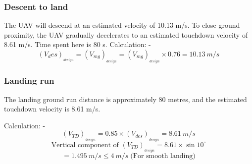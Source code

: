 \documentclass[12 pt]{article}
\begin{document}
\subsubsection{Descent to land \cite{Anderson1}}
The UAV will descend at an estimated velocity of 10.13 m/s. To close ground proximity, the UAV gradually decelerates to an estimated touchdown velocity of 8.61 m/s. Time spent here is 80 s.
Calculation: - 
$$(V_des)_{_{design}} = (V_{mg})_{_{design}} = (V_{mg})_{_{design}} \times 0.76 = 10.13 \: m/s $$

\subsubsection{Landing run}
The landing ground run distance is approximately 80 metres, and the estimated touchdown velocity is 8.61 m/s.

Calculation: - 
$$ (V_{TD})_{_{design}} = 0.85 \times (V_{des})_{_{design}} = 8.61 \: m/s  $$
$$ \text{Vertical component of } (V_{TD})_{_{design}} = 8.61 \times \sin{10^{\circ}} $$
$$ = 1.495 \: m/s \leq 4 \: m/s \; \text{(For smooth landing)} $$
\end{document}
